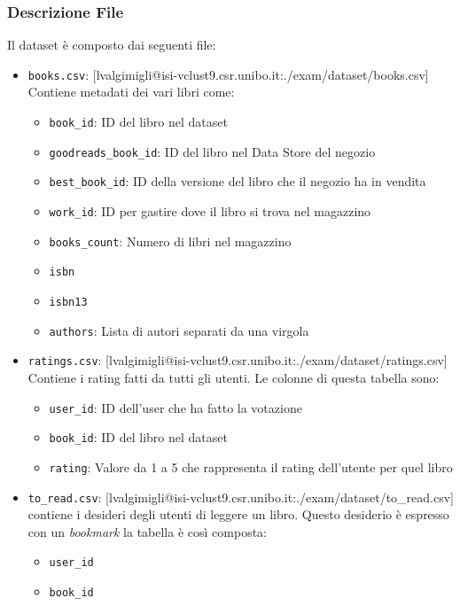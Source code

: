 \documentclass[11pt]{article}
\begin{document}
\subsubsection{Descrizione File}
Il dataset è composto dai seguenti file:
\begin{itemize}
    \item \texttt{books.csv}: [lvalgimigli@isi-vclust9.csr.unibo.it:./exam/dataset/books.csv] Contiene metadati dei vari libri come:
    \begin{itemize}
        \item \texttt{book\_id}: ID del libro nel dataset
        \item \texttt{goodreads\_book\_id}: ID del libro nel Data Store del negozio
        \item \texttt{best\_book\_id}: ID della versione del libro che il negozio ha in vendita
        \item \texttt{work\_id}: ID per gastire dove il libro si trova nel magazzino
        \item \texttt{books\_count}: Numero di libri nel magazzino
        \item \texttt{isbn}
        \item \texttt{isbn13}
        \item \texttt{authors}: Lista di autori separati da una virgola
    \end{itemize}
    \item \texttt{ratings.csv}: [lvalgimigli@isi-vclust9.csr.unibo.it:./exam/dataset/ratings.csv] Contiene i rating fatti da tutti gli utenti. Le colonne di questa tabella sono:
    \begin{itemize}
        \item \texttt{user\_id}: ID dell'user che ha fatto la votazione
        \item \texttt{book\_id}: ID del libro nel dataset
        \item \texttt{rating}: Valore da 1 a 5 che rappresenta il rating dell'utente per quel libro
    \end{itemize}
    \item \texttt{to\_read.csv}: [lvalgimigli@isi-vclust9.csr.unibo.it:./exam/dataset/to\_read.csv] contiene i desideri degli utenti di leggere un libro. Questo desiderio è espresso con un \textit{bookmark}
            la tabella è così composta:
    \begin{itemize}
        \item \texttt{user\_id}
        \item \texttt{book\_id}
    \end{itemize}

\end{itemize}
\end{document}
